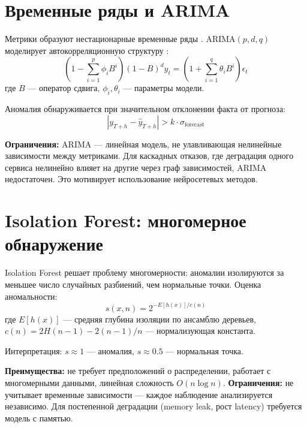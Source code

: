 \section{Временные ряды и ARIMA}

Метрики образуют нестационарные временные ряды \cite{time_series_anomaly,acm_anomaly_detection}. \linebreak ARIMA$(p,d,q)$ моделирует автокорреляционную структуру \cite{hastie_elements}:
\begin{equation}
(1 - \sum_{i=1}^{p} \phi_i B^i)(1-B)^d y_t = (1 + \sum_{i=1}^{q} \theta_i B^i)\epsilon_t
\label{eq:arima}
\end{equation}
где $B$ --- оператор сдвига, $\phi_i, \theta_i$ --- параметры модели.

Аномалия обнаруживается при значительном отклонении факта от прогноза:
\begin{equation}
|y_{T+h} - \hat{y}_{T+h}| > k \cdot \sigma_{\text{forecast}}
\label{eq:arima_anomaly}
\end{equation}

\textbf{Ограничения:} ARIMA --- линейная модель, не улавливающая нелинейные зависимости между метриками. Для каскадных отказов, где деградация одного сервиса нелинейно влияет на другие через граф зависимостей, ARIMA недостаточен. Это мотивирует использование нейросетевых методов.

\section{Isolation Forest: многомерное обнаружение}

Isolation Forest \cite{isolation_forest} решает проблему многомерности: аномалии изолируются за меньшее число случайных разбиений, чем нормальные точки. Оценка аномальности:
\begin{equation}
s(x, n) = 2^{-E[h(x)]/c(n)}
\label{eq:isolation_forest}
\end{equation}
где $E[h(x)]$ --- средняя глубина изоляции по ансамблю деревьев, $c(n) = 2H(n-1) - 2(n-1)/n$ --- нормализующая константа.

Интерпретация: $s \approx 1$ --- аномалия, $s \approx 0.5$ --- нормальная точка.

\textbf{Преимущества:} не требует предположений о распределении, работает с многомерными данными, линейная сложность $O(n \log n)$. \textbf{Ограничения:} не учитывает временные зависимости --- каждое наблюдение анализируется независимо. Для постепенной деградации (memory leak, рост latency) требуется модель с памятью.

